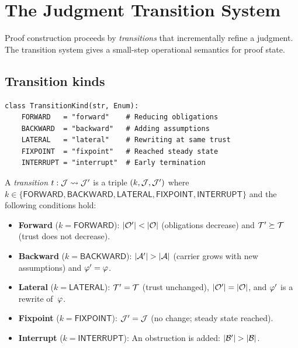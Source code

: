 \documentclass[11pt]{article}
\begin{document}
\section{The Judgment Transition System}\label{sec:transitions}

Proof construction proceeds by \emph{transitions} that incrementally
refine a judgment.  The transition system gives a small-step operational
semantics for proof state.

\subsection{Transition kinds}

\begin{lstlisting}[caption={Transition kinds (from \texttt{models.py}).},
  label=lst:transition]
class TransitionKind(str, Enum):
    FORWARD   = "forward"    # Reducing obligations
    BACKWARD  = "backward"   # Adding assumptions
    LATERAL   = "lateral"    # Rewriting at same trust
    FIXPOINT  = "fixpoint"   # Reached steady state
    INTERRUPT = "interrupt"  # Early termination
\end{lstlisting}

\begin{definition}\label{def:transition}
A \emph{transition} $t : \mathcal{J} \leadsto \mathcal{J}'$ is a triple
$(k, \mathcal{J}, \mathcal{J}')$ where $k \in \{\mathsf{FORWARD}, \mathsf{BACKWARD},
\mathsf{LATERAL}, \mathsf{FIXPOINT}, \mathsf{INTERRUPT}\}$ and the
following conditions hold:
\begin{itemize}
  \item \textbf{Forward} ($k = \mathsf{FORWARD}$): $|\mathcal{O}'| < |\mathcal{O}|$
        (obligations decrease) and $\mathcal{T}' \succeq \mathcal{T}$
        (trust does not decrease).
  \item \textbf{Backward} ($k = \mathsf{BACKWARD}$): $|\mathcal{A}'| > |\mathcal{A}|$
        (carrier grows with new assumptions) and $\varphi' = \varphi$.
  \item \textbf{Lateral} ($k = \mathsf{LATERAL}$): $\mathcal{T}' = \mathcal{T}$
        (trust unchanged), $|\mathcal{O}'| = |\mathcal{O}|$, and $\varphi'$ is a
        rewrite of~$\varphi$.
  \item \textbf{Fixpoint} ($k = \mathsf{FIXPOINT}$): $\mathcal{J}' = \mathcal{J}$
        (no change; steady state reached).
  \item \textbf{Interrupt} ($k = \mathsf{INTERRUPT}$): An obstruction is
        added: $|\mathcal{B}'| > |\mathcal{B}|$.
\end{itemize}
\end{definition}
\end{document}
